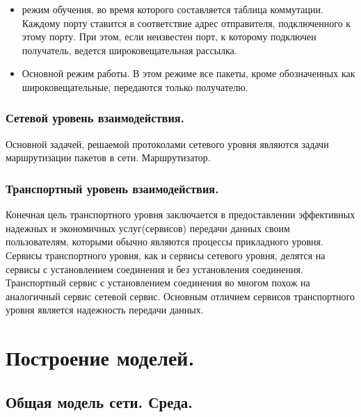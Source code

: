 \documentclass[12pt]{report}
\begin{document}
    \begin{itemize}
        \item режим обучения, во время которого составляется таблица коммутации. Каждому порту ставится в соответствие адрес отправителя, подключенного к этому порту. При этом, если неизвестен порт, к которому подключен получатель, ведется широковещательная рассылка.
        \item Основной режим работы. В этом режиме все пакеты, кроме обозначенных как широковещательные, передаются только получателю.
    \end{itemize}

    \subsubsection{Сетевой уровень взаимодействия. }

    Основной задачей, решаемой протоколами сетевого уровня являются задачи маршрутизации пакетов в сети.
    Маршрутизатор.

    \subsubsection{Транспортный уровень взаимодействия. }

    Конечная цель транспортного уровня заключается в предоставлении эффективных надежных и экономичных услуг(сервисов) передачи данных своим пользователям, которыми обычно являются процессы прикладного уровня. Сервисы транспортного уровня, как и сервисы сетевого уровня, делятся на сервисы с установлением соединения и без установления соединения. Транспортный сервис с установлением соединения во многом похож на аналогичный сервис сетевой сервис. Основным отличием сервисов транспортного уровня является надежность передачи данных.

    \section{Построение моделей. }

    \subsection{Общая модель сети. Среда.}

\end{document}
